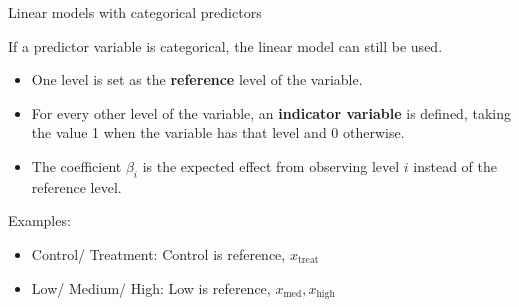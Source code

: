 \documentclass[
  ignorenonframetext,
]{beamer}
\providecommand{\tightlist}{%
  \setlength{\itemsep}{0pt}\setlength{\parskip}{0pt}}
\begin{document}
\begin{frame}{Linear models with categorical predictors}
\protect\hypertarget{linear-models-with-categorical-predictors}{}

If a predictor variable is categorical, the linear model can still be
used.

\begin{itemize}
\tightlist
\item
  One level is set as the \textbf{reference} level of the variable.
\item
  For every other level of the variable, an \textbf{indicator variable}
  is defined, taking the value 1 when the variable has that level and 0
  otherwise.
\item
  The coefficient \(\beta_i\) is the expected effect from observing
  level \(i\) instead of the reference level.
\end{itemize}

Examples:

\begin{itemize}
\tightlist
\item
  Control/ Treatment: Control is reference, \(x_\text{treat}\)
\item
  Low/ Medium/ High: Low is reference, \(x_\text{med}, x_\text{high}\)
\end{itemize}

\end{frame}
\end{document}
